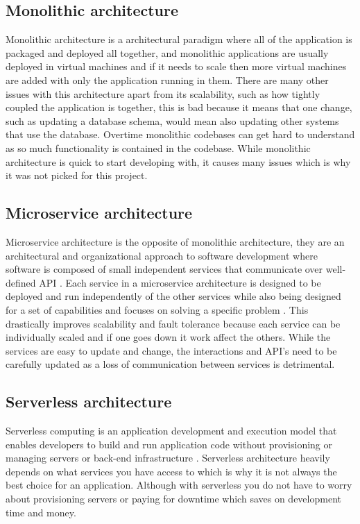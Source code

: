 \documentclass[]{project_report}
\begin{document}
\subsection{Monolithic architecture}

Monolithic architecture is a architectural paradigm where all of the application is packaged and deployed all together, and monolithic applications are usually deployed in virtual machines and if it needs to scale then more virtual machines are added with only the application running in them. There are many other issues with this architecture apart from its scalability, such as how tightly coupled the application is together, this is bad because it means that one change, such as updating a database schema, would mean also updating other systems that use the database. Overtime monolithic codebases can get hard to understand as so much functionality is contained in the codebase. While monolithic architecture is quick to start developing with, it causes many issues which is why it was not picked for this project.

\subsection{Microservice architecture}

Microservice architecture is the opposite of monolithic architecture, they are an architectural and organizational approach to software development where software is composed of small independent services that communicate over well-defined API \cite{aws_microservices}. Each service in a microservice architecture is designed to be deployed and run independently of the other services while also being designed for a set of capabilities and focuses on solving a specific problem \cite{aws_microservices}. This drastically improves scalability and fault tolerance because each service can be individually scaled and if one goes down it work affect the others. While the services are easy to update and change, the interactions and API's need to be carefully updated as a loss of communication between services is detrimental.

\subsection{Serverless architecture}

Serverless computing is an application development and execution model that enables developers to build and run application code without provisioning or managing servers or back-end infrastructure \cite{ibm_serverless}. Serverless architecture heavily depends on what services you have access to which is why it is not always the best choice for an application. Although with serverless you do not have to worry about provisioning servers or paying for downtime which saves on development time and money.
\end{document}
